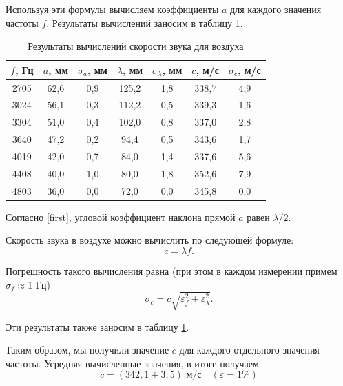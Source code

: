 \documentclass[a4paper, 12pt]{article}
\begin{document}
            \noindent Используя эти формулы вычисляем коэффициенты $a$ для каждого значения частоты $f$. Результаты вычислений заносим в таблицу \ref{tab:resSpeed}.

            \begin{table}[H]
                \centering
                \begin{tabular}{|c|c|c|c|c|c|c|}
                    \hline
                    $f$, Гц & $a$, мм & $\sigma_a$, мм & $\lambda$, мм & $\sigma_\lambda$, мм & $c$, м/с & $\sigma_c$, м/с \\ \hline
                    2705 & 62,6 & 0,9 & 125,2 & 1,8 & 338,7 & 4,9 \\ \hline
                    3024 & 56,1 & 0,3 & 112,2 & 0,5 & 339,3 & 1,6 \\ \hline
                    3304 & 51,0 & 0,4 & 102,0 & 0,8 & 337,0 & 2,8 \\ \hline
                    3640 & 47,2 & 0,2 & 94,4  & 0,5 & 343,6 & 1,7 \\ \hline
                    4019 & 42,0 & 0,7 & 84,0  & 1,4 & 337,6 & 5,6 \\ \hline
                    4408 & 40,0 & 1,0 & 80,0  & 1,8 & 352,6 & 7,9 \\ \hline
                    4803 & 36,0 & 0,0 & 72,0  & 0,0 & 345,8 & 0,0 \\ \hline
                \end{tabular}
                \caption{Результаты вычислений скорости звука для воздуха}
                \label{tab:resSpeed}
            \end{table}

            \noindent Согласно \eqref{first}, угловой коэффициент наклона прямой $a$ равен $\lambda/2$.

            \noindent Скорость звука в воздухе можно вычислить по следующей формуле: 
            \[ c = \lambda f. \]
            
            \noindent Погрешность такого вычисления равна (при этом в каждом измерении примем $\sigma_f \approx 1$ Гц)
            \[ \sigma_c=c\sqrt{\varepsilon_f^2+\varepsilon_\lambda^2}. \]
            
            \noindent Эти результаты также заносим в таблицу \ref{tab:resSpeed}.
            
            \noindent Таким образом, мы получили значение $c$ для каждого отдельного значения частоты. Усредняя вычисленные значения, в итоге получаем \[\boxed{ c = (342,1 \pm 3,5) \text{ м/с}}\quad (\varepsilon=1\%) \]
            
\end{document}
